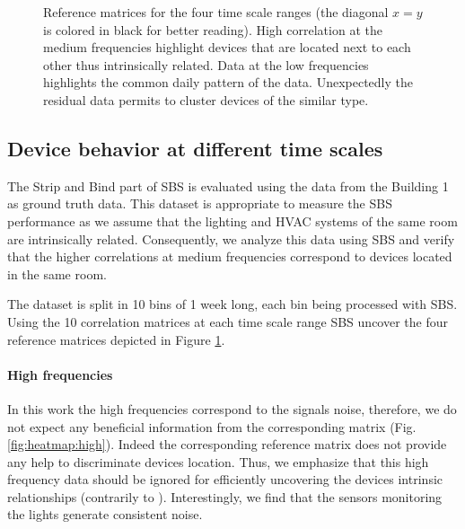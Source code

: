 \begin{figure}[t!]
\caption{Reference matrices for the four time scale ranges (the diagonal $x=y$ is colored in black for better reading). High correlation at the medium frequencies highlight devices that are located next to each other thus intrinsically related. Data at the low frequencies highlights the common daily pattern of the data. Unexpectedly the residual data permits to cluster devices of the similar type.}
\label{fig:heatmap}
\end{figure}

\subsection{Device behavior at different time scales}
The Strip and Bind part of SBS is evaluated using the data from the Building 1 as ground truth data.
This dataset is appropriate to measure the SBS performance as we assume that the lighting and HVAC systems of the same room are intrinsically related.
Consequently, we analyze this data using SBS and verify that the higher correlations at medium frequencies correspond to devices located in the same room. %

The dataset is split in 10 bins of 1 week long, each bin being processed with SBS.
Using the 10 correlation matrices at each time scale range SBS uncover the four reference matrices depicted in Figure \ref{fig:heatmap}.

\paragraph{High frequencies}
In this work the high frequencies correspond to the signals noise, therefore, we do not expect any beneficial information from the corresponding matrix (Fig. \ref{fig:heatmap:high}).
Indeed the corresponding reference matrix does not provide any help to discriminate devices location.
Thus, we emphasize that this high frequency data should be ignored for efficiently uncovering the devices intrinsic relationships (contrarily to \cite{romain:iotapp12}).
Interestingly, we find that the sensors monitoring the lights generate consistent noise. %
  
